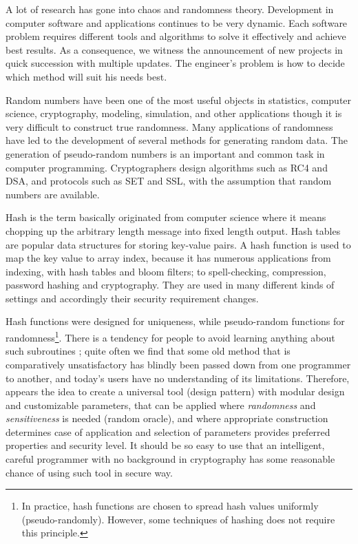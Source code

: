 \documentclass[twocolumn, a4paper, 10pt]{article}
\begin{document}
A lot of research has gone into chaos and randomness theory. Development in computer software and applications continues to be very dynamic. Each software problem requires different tools and algorithms to solve it effectively and achieve best results. As a consequence, we witness the announcement of new projects in quick succession with multiple updates. The engineer's problem is how to decide which method will suit his needs best.

Random numbers have been one of the most useful objects in statistics, computer science, cryptography, modeling, simulation, and other applications though it is very difficult to construct true randomness. Many applications of randomness have led to the development of several methods for generating random data. The generation of pseudo-random numbers is an important and common task in computer programming. Cryptographers design algorithms such as RC4 and DSA, and protocols such as SET and SSL, with the assumption that random numbers are available.

Hash is the term basically originated from computer science where it means chopping up the arbitrary length message into fixed length output. Hash tables are popular data structures for storing key-value pairs. A hash function is used to map the key value to array index, because it has numerous applications from indexing, with hash tables and bloom filters; to spell-checking, compression, password hashing and cryptography. They are used in many different kinds of settings and accordingly their security requirement changes.

Hash functions were designed for uniqueness, while pseudo-random functions for randomness\footnote{In practice, hash functions are chosen to spread hash values uniformly (pseudo-randomly). However, some techniques of hashing does not require this principle.}. There is a tendency for people to avoid learning anything about such subroutines \cite{Knuth1973}; quite often we find that some old method that is comparatively unsatisfactory has blindly been passed down from one programmer to another, and today's users have no understanding of its limitations. Therefore, appears the idea to create a universal tool (design pattern) with modular design and customizable parameters, that can be applied where \textit{randomness} and \textit{sensitiveness} is needed (random oracle), and where appropriate construction determines case of application and selection of parameters provides preferred properties and security level. It should be so easy to use that an intelligent, careful programmer with no background in cryptography has some reasonable chance of using such tool in secure way.
\end{document}
